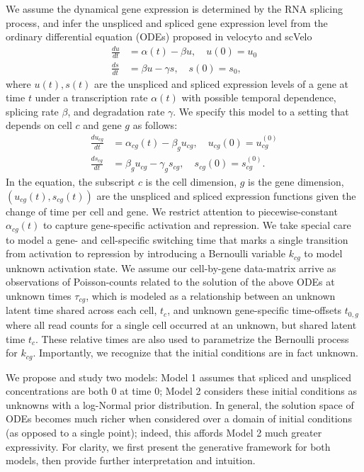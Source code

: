\documentclass[
  sn-mathphys-num,
  lineno,
  twocolumn]{sn-jnl}
\begin{document}
We assume the dynamical gene expression is determined by the RNA
splicing process, and infer the unspliced and spliced gene expression
level from the ordinary differential equation (ODEs) proposed in
velocyto \citep{La_Manno2018-lj} and scVelo \citep{Bergen2020-pj}
\begin{align}
\frac{du}{dt} &= \alpha(t) - \beta u, \quad u(0) = u_0 \label{eq-dudt}\\
   \frac{ds}{dt} &= \beta u - \gamma s, \quad s(0) = s_0, \label{eq-dsdt}
\end{align} where \(u(t), s(t)\) are the unspliced and spliced
expression levels of a gene at time \(t\) under a transcription rate
\(\alpha(t)\) with possible temporal dependence, splicing rate
\(\beta\), and degradation rate \(\gamma\). We specify this model to a
setting that depends on cell \(c\) and gene \(g\) as follows:
\begin{align}
\frac{du_{cg}}{dt} &= \alpha_{cg}(t) - \beta_{g} u_{cg}, \quad u_{cg}(0) = u_{cg}^{(0)} \label{eq-dudt}\\
   \frac{ds_{cg}}{dt} &= \beta_{g} u_{cg} - \gamma_{g} s_{cg}, \quad s_{cg}(0) = s_{cg}^{(0)} \label{eq-dsdt}.
\end{align} In the equation, the subscript \(c\) is the cell dimension,
\(g\) is the gene dimension, \(\left( u_{cg}(t), s_{cg}(t) \right)\) are
the unspliced and spliced expression functions given the change of time
per cell and gene. We restrict attention to piecewise-constant
\(\alpha_{cg}(t)\) to capture gene-specific activation and repression.
We take special care to model a gene- and cell-specific switching time
that marks a single transition from activation to repression by
introducing a Bernoulli variable \(k_{cg}\) to model unknown activation
state. We assume our cell-by-gene data-matrix arrive as observations of
Poisson-counts related to the solution of the above ODEs at unknown
times \(\tau_{cg}\), which is modeled as a relationship between an
unknown latent time shared across each cell, \(t_c\), and unknown
gene-specific time-offsets \(t_{0,g}\) where all read counts for a
single cell occurred at an unknown, but shared latent time \(t_c\).
These relative times are also used to parametrize the Bernoulli process
for \(k_{cg}\). Importantly, we recognize that the initial conditions
are in fact unknown.

We propose and study two models: Model 1 assumes that spliced and
unspliced concentrations are both 0 at time 0; Model 2 considers these
initial conditions as unknowns with a log-Normal prior distribution. In
general, the solution space of ODEs becomes much richer when considered
over a domain of initial conditions (as opposed to a single point);
indeed, this affords Model 2 much greater expressivity. For clarity, we
first present the generative framework for both models, then provide
further interpretation and intuition.
\end{document}
